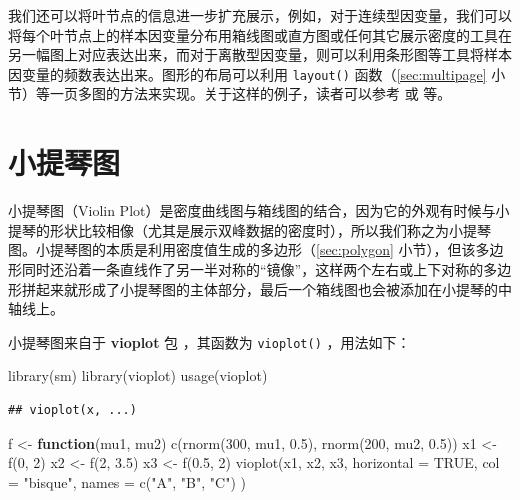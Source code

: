 \documentclass[
  b5paper,
  UTF8,twoside]{book}
\newenvironment{Shaded}{\begin{snugshade}}{\end{snugshade}}
\newcommand{\AttributeTok}[1]{\textcolor[rgb]{0.77,0.63,0.00}{#1}}
\newcommand{\ConstantTok}[1]{\textcolor[rgb]{0.00,0.00,0.00}{#1}}
\newcommand{\ControlFlowTok}[1]{\textcolor[rgb]{0.13,0.29,0.53}{\textbf{#1}}}
\newcommand{\DecValTok}[1]{\textcolor[rgb]{0.00,0.00,0.81}{#1}}
\newcommand{\FloatTok}[1]{\textcolor[rgb]{0.00,0.00,0.81}{#1}}
\newcommand{\FunctionTok}[1]{\textcolor[rgb]{0.00,0.00,0.00}{#1}}
\newcommand{\NormalTok}[1]{#1}
\newcommand{\OtherTok}[1]{\textcolor[rgb]{0.56,0.35,0.01}{#1}}
\newcommand{\StringTok}[1]{\textcolor[rgb]{0.31,0.60,0.02}{#1}}
\begin{document}
我们还可以将叶节点的信息进一步扩充展示，例如，对于连续型因变量，我们可以将每个叶节点上的样本因变量分布用箱线图或直方图或任何其它展示密度的工具在另一幅图上对应表达出来，而对于离散型因变量，则可以利用条形图等工具将样本因变量的频数表达出来。图形的布局可以利用 \texttt{layout()} 函数（\ref{sec:multipage} 小节）等一页多图的方法来实现。关于这样的例子，读者可以参考 \citet{Everitt06} 或 \citet{Xie07} 等。

\hypertarget{sec:vioplot}{%
\section{小提琴图}\label{sec:vioplot}}

小提琴图（Violin Plot）是密度曲线图与箱线图的结合，因为它的外观有时候与小提琴的形状比较相像（尤其是展示双峰数据的密度时），所以我们称之为小提琴图。小提琴图的本质是利用密度值生成的多边形（\ref{sec:polygon} 小节），但该多边形同时还沿着一条直线作了另一半对称的``镜像''，这样两个左右或上下对称的多边形拼起来就形成了小提琴图的主体部分，最后一个箱线图也会被添加在小提琴的中轴线上。

小提琴图来自于 \textbf{vioplot} 包 \citep{vioplot}，其函数为 \texttt{vioplot()} ，用法如下：

\begin{Shaded}
\begin{Highlighting}[]
\FunctionTok{library}\NormalTok{(sm)}
\FunctionTok{library}\NormalTok{(vioplot)}
\FunctionTok{usage}\NormalTok{(vioplot)}
\end{Highlighting}
\end{Shaded}

\begin{verbatim}
## vioplot(x, ...)
\end{verbatim}





\begin{Shaded}
\begin{Highlighting}[]
\NormalTok{f }\OtherTok{\textless{}{-}} \ControlFlowTok{function}\NormalTok{(mu1, mu2)}
  \FunctionTok{c}\NormalTok{(}\FunctionTok{rnorm}\NormalTok{(}\DecValTok{300}\NormalTok{, mu1, }\FloatTok{0.5}\NormalTok{), }\FunctionTok{rnorm}\NormalTok{(}\DecValTok{200}\NormalTok{, mu2, }\FloatTok{0.5}\NormalTok{))}
\NormalTok{x1 }\OtherTok{\textless{}{-}} \FunctionTok{f}\NormalTok{(}\DecValTok{0}\NormalTok{, }\DecValTok{2}\NormalTok{)}
\NormalTok{x2 }\OtherTok{\textless{}{-}} \FunctionTok{f}\NormalTok{(}\DecValTok{2}\NormalTok{, }\FloatTok{3.5}\NormalTok{)}
\NormalTok{x3 }\OtherTok{\textless{}{-}} \FunctionTok{f}\NormalTok{(}\FloatTok{0.5}\NormalTok{, }\DecValTok{2}\NormalTok{)}
\FunctionTok{vioplot}\NormalTok{(x1, x2, x3,}
  \AttributeTok{horizontal =} \ConstantTok{TRUE}\NormalTok{, }\AttributeTok{col =} \StringTok{"bisque"}\NormalTok{,}
  \AttributeTok{names =} \FunctionTok{c}\NormalTok{(}\StringTok{"A"}\NormalTok{, }\StringTok{"B"}\NormalTok{, }\StringTok{"C"}\NormalTok{)}
\NormalTok{)}
\end{Highlighting}
\end{Shaded}
\end{document}
